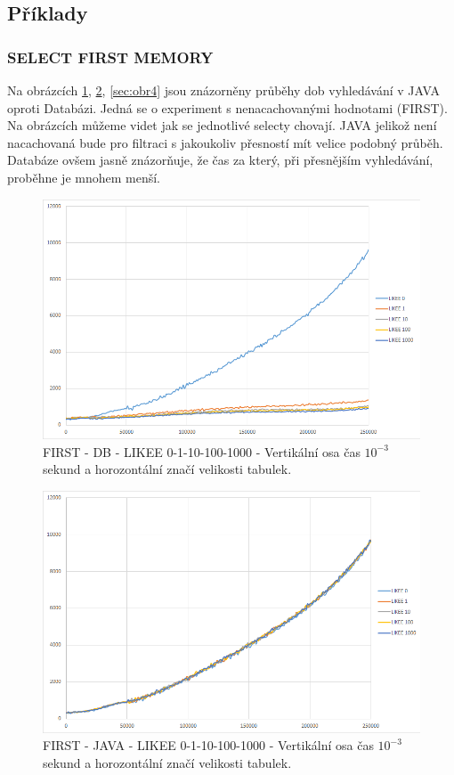 \documentclass[a4paper, 11pt]{article}
\begin{document}
\subsection{Příklady}

\subsubsection{SELECT FIRST MEMORY}
Na obrázcích \ref{sec:obr5}, \ref{sec:obr6}, \ref{sec:obr4} jsou znázorněny průběhy dob vyhledávání v JAVA oproti Databázi. Jedná se o experiment s nenacachovanými hodnotami (FIRST). Na obrázcích můžeme videt jak se jednotlivé selecty chovají. JAVA jelikož není nacachovaná bude pro filtraci  s jakoukoliv přesností mít velice podobný průběh. Databáze ovšem jasně znázorňuje, že čas za který, při přesnějším vyhledávání, proběhne je mnohem menší.

\begin{figure}[H]
\centering
\includegraphics[width=150mm, frame]{images/FIRST-DB.png}
\caption{FIRST - DB - LIKEE 0-1-10-100-1000 - Vertikální osa čas $10^{-3}$ sekund a horozontální značí velikosti tabulek.}
\label{sec:obr5}
\end{figure}

\begin{figure}[H]
\centering
\includegraphics[width=150mm, frame]{images/FIRST-JAVA.png}
\caption{FIRST - JAVA - LIKEE 0-1-10-100-1000 - Vertikální osa čas $10^{-3}$ sekund a horozontální značí velikosti tabulek.}
\label{sec:obr6}
\end{figure}
\end{document}
